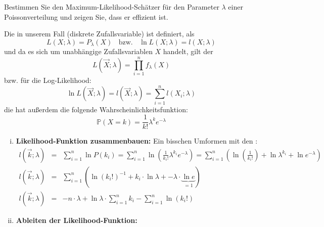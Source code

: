 \begin{uebsp}
\begin{Exercise}[label=ex:8.1]
Bestimmen Sie den Maximum-Likelihood-Schätzer für den Parameter $\lambda$ einer Poissonverteilung und zeigen Sie, dass er effizient ist.
\end{Exercise}
\begin{Answer}

\begin{uebsp_theory}
Die  in unserem Fall (diskrete Zufallsvariable) ist definiert, als 
\[L(X;\lambda)=P_\lambda(X)\;\;\text{ bzw. }\;\;\ln L(X;\lambda)=l(X;\lambda)\]
und da es sich um unabhängige Zufallsvariablen $X$ handelt, gilt der 
\[L(\vec X;\lambda)=\prod_{i=1}^nf_\lambda(X)\]
bzw. für die Log-Likelihood:
\[\ln L(\vec X;\lambda)=l(\vec X;\lambda)=\sum_{i=1}^nl(X_i;\lambda)\]
die  hat außerdem die folgende Wahrscheinlichkeitsfunktion:
\[
\mathbb P\left(X=k\right)=\frac{1}{k!}\lambda ^{k}e^{-\lambda }
\]
\end{uebsp_theory}
\begin{enumerate}[i)]
    \item \textbf{Likelihood-Funktion zusammenbauen:}
    Ein bisschen Umformen mit den :
        \begin{eqnarray*}
            l(\vec k;\lambda)&=&\sum_{i=1}^n\ln P(k_i) = \sum_{i=1}^n\ln\left(\frac{1}{k_i!}\lambda ^{k_i}e^{-\lambda }\right) = \sum_{i=1}^n\left(\ln\left(\frac{1}{k_i!}\right)+\ln\lambda ^{k_i}+\ln e^{-\lambda }\right)\\
            l(\vec k;\lambda)&=&\sum_{i=1}^n\left(\ln\left(k_i!\right)^{-1}+k_i\cdot \ln\lambda+-\lambda\cdot \underbrace{\ln e}_{=1}\right)\\
            l(\vec k;\lambda)&=&-n\cdot \lambda+\ln\lambda\cdot\sum_{i=1}^nk_i-\sum_{i=1}^n\ln(k_i!)
        \end{eqnarray*}
    \item \textbf{Ableiten der Likelihood-Funktion:}
        \begin{eqnarray*}

\end{eqnarray*}
\end{enumerate}
\end{Answer}
\end{uebsp}

